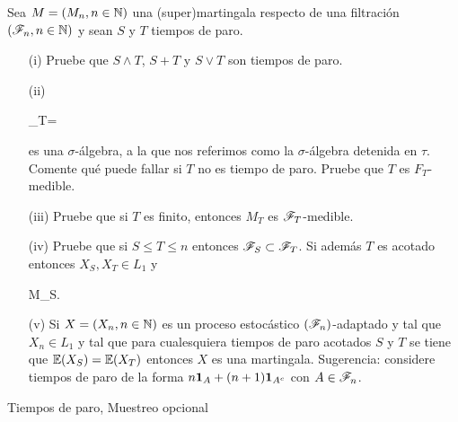 \begin{problema}
	Sea ${M=\left( M_n,n\in\mathbb{N}\right) }$ una (super)martingala respecto de una filtraci\'on ${\left( \mathscr{F}_n,n\in\mathbb{N}\right) }$ y sean ${S}$ y ${T}$ tiempos de paro.
	
\begin{enumerate}
                \item[(i)] 
                	Pruebe que ${S\wedge T}$, ${S+T}$ y ${S\vee T}$ son tiempos de paro.
                
                \item[(ii)] 
                	\begin{esn}
                		\F_T=
                	\end{esn}
                	es una ${\sigma}$-\'algebra, a la que nos referimos como la ${\sigma}$-\'algebra 
                	detenida en ${\tau}$. Comente qu\'e puede fallar si ${T}$ no es tiempo de paro. 
                	Pruebe que ${T}$ es ${F_T}$-medible. 
                
                \item[(iii)] 
                	Pruebe que si ${T}$ es finito, entonces ${M_T}$ es ${\mathscr{F}_T}$-medible.
                
                \item[(iv)] 
                	Pruebe que si ${S\leq T\leq n}$ entonces ${\mathscr{F}_S\subset\mathscr{F}_T}$. Si adem\'as ${T}$ es acotado entonces ${X_S,X_T\in L_1}$ y 
                	\begin{esn}
	                	\leq M_S.
                	\end{esn}

                \item[(v)] 
                	Si ${X=\left( X_n,n\in\mathbb{N}\right) }$ es un proceso estoc\'astico ${\left( \mathscr{F}_n\right) }$-adaptado y tal que ${X_n\in L_1}$ y tal que 
                	para cualesquiera tiempos de paro acotados ${S}$ y ${T}$ se tiene que ${\mathbb{E}\! \left( X_S \right)=\mathbb{E}\! \left( X_T \right)}$ entonces ${X}$ es una 
                	martingala. Sugerencia: considere tiempos de paro de la forma ${n{\bf{1}}_{A}+(n+1){\bf{1}}_{A^c}}$ con ${A\in\mathscr{F}_n}$.
\end{enumerate}

Tiempos de paro, Muestreo opcional
\end{problema}


